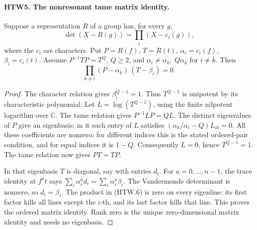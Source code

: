 \paragraph{HTW5. The nonresonant tame matrix identity.}
\label{claim:HTW5}
Suppose a representation \(R\) of a group has, for every \(g\),
\[
 \det(X-R(g))=\prod_i(X-c_i(g)),
\]
where the \(c_i\) are characters.  Put \(P=R(f)\), \(T=R(t)\),
\(\alpha_i=c_i(f)\), \(\beta_i=c_i(t)\).  Assume
\(P^{-1}TP=T^Q\), \(Q\ge2\), and
\(\alpha_i\ne\alpha_k,\ Q\alpha_k\) for \(i\ne k\).
Then
\[
 \prod_{k\ne i}(P-\alpha_k)\,(T-\beta_i)=0 .
 \tag{HTW.6}
\]
\begin{proof}
The character relation gives \(\beta_i^{Q-1}=1\).
Thus \(T^{Q-1}\) is unipotent by its characteristic
polynomial.  Let \(L=\log(T^{Q-1})\), using the finite
nilpotent logarithm over \(\mathbb C\).  The tame relation
gives \(P^{-1}LP=QL\).  The distinct eigenvalues of \(P\)
give an eigenbasis; in it each entry of \(L\) satisfies
\((\alpha_k/\alpha_i-Q)L_{ik}=0\).  All these coefficients
are nonzero: for different indices this is the stated
ordered-pair condition, and for equal indices it is
\(1-Q\).  Consequently \(L=0\), hence \(T^{Q-1}=1\).
The tame relation now gives \(PT=TP\).

In that eigenbasis \(T\) is diagonal, say with entries
\(d_i\).  For \(a=0,\ldots,n-1\), the trace identity at
\(f^at\) says
\(\sum_i\alpha_i^a d_i=\sum_i\alpha_i^a\beta_i\).
The Vandermonde determinant is nonzero, so \(d_i=\beta_i\).
The product in (HTW.6) is zero on every eigenline: its
first factor kills all lines except the \(i\)-th, and its
last factor kills that line.  This proves the ordered
matrix identity.  Rank zero is the unique zero-dimensional
matrix identity and needs no eigenbasis.
\end{proof}

